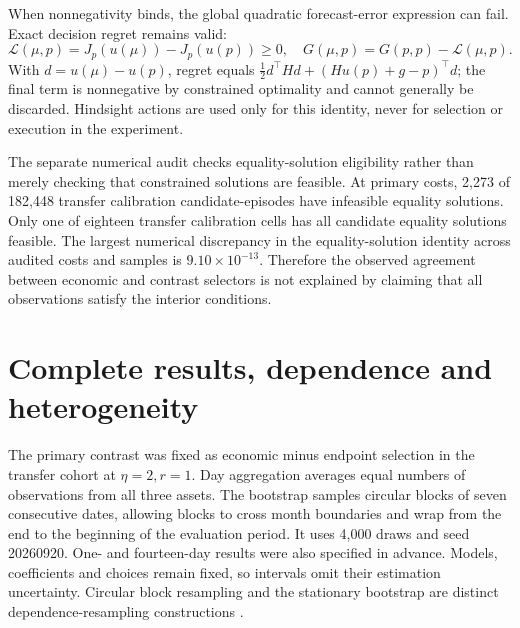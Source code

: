 \documentclass[11pt]{article}
\begin{document}
When nonnegativity binds, the global quadratic forecast-error expression can fail. Exact decision regret remains valid:
\[
\mathcal L(\mu,p)=J_p(u(\mu))-J_p(u(p))\geq0,
\quad G(\mu,p)=G(p,p)-\mathcal L(\mu,p).
\]
With $d=u(\mu)-u(p)$, regret equals $\tfrac12d^\top Hd+(Hu(p)+g-p)^\top d$; the final term is nonnegative by constrained optimality and cannot generally be discarded. Hindsight actions are used only for this identity, never for selection or execution in the experiment.

The separate numerical audit checks equality-solution eligibility rather than merely checking that constrained solutions are feasible. At primary costs, 2,273 of 182,448 transfer calibration candidate-episodes have infeasible equality solutions. Only one of eighteen transfer calibration cells has all candidate equality solutions feasible. The largest numerical discrepancy in the equality-solution identity across audited costs and samples is $9.10\times10^{-13}$. Therefore the observed agreement between economic and contrast selectors is not explained by claiming that all observations satisfy the interior conditions.
\section{Complete results, dependence and heterogeneity}
The primary contrast was fixed as economic minus endpoint selection in the transfer cohort at $\eta=2,r=1$. Day aggregation averages equal numbers of observations from all three assets. The bootstrap samples circular blocks of seven consecutive dates, allowing blocks to cross month boundaries and wrap from the end to the beginning of the evaluation period. It uses 4,000 draws and seed 20260920. One- and fourteen-day results were also specified in advance. Models, coefficients and choices remain fixed, so intervals omit their estimation uncertainty. Circular block resampling and the stationary bootstrap are distinct dependence-resampling constructions \citep{politis1994}.
\end{document}
